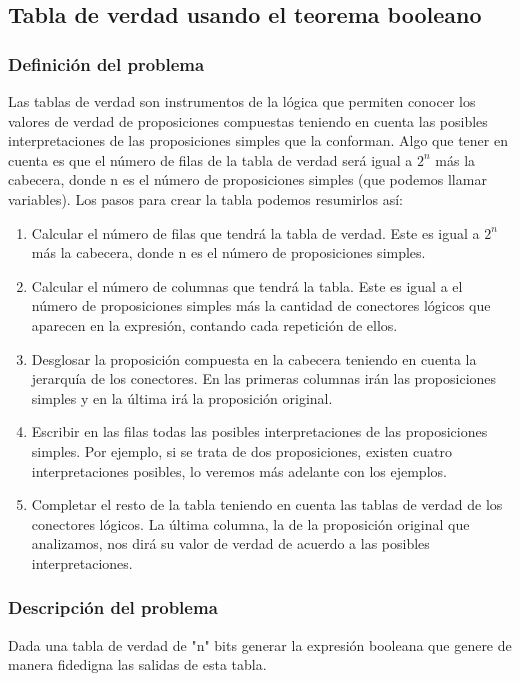 \subsection{Tabla de verdad usando el teorema booleano}

\subsubsection{Definición del problema}
Las tablas de verdad son instrumentos de la lógica que permiten conocer los valores de verdad de proposiciones compuestas teniendo en cuenta las posibles interpretaciones de las proposiciones simples que la conforman.
Algo que tener en cuenta es que el número de filas de la tabla de verdad será igual a $2^n$ más la cabecera, donde n es el número de proposiciones simples (que podemos llamar variables). Los pasos para crear la tabla podemos resumirlos así:
\begin{enumerate}
    \item Calcular el número de filas que tendrá la tabla de verdad. Este es igual a $2^n$ más la cabecera, donde n es el número de proposiciones simples.
    \item Calcular el número de columnas que tendrá la tabla. Este es igual a el número de proposiciones simples más la cantidad de conectores lógicos que aparecen en la expresión, contando cada repetición de ellos.
    \item Desglosar la proposición compuesta en la cabecera teniendo en cuenta la jerarquía de los conectores. En las primeras columnas irán las proposiciones simples y en la última irá la proposición original.
    \item Escribir en las filas todas las posibles interpretaciones de las proposiciones simples. Por ejemplo, si se trata de dos proposiciones, existen cuatro interpretaciones posibles, lo veremos más adelante con los ejemplos.
    \item Completar el resto de la tabla teniendo en cuenta las tablas de verdad de los conectores lógicos. La última columna, la de la proposición original que analizamos, nos dirá su valor de verdad de acuerdo a las posibles interpretaciones. \cite{TablasdeVerdad}
\end{enumerate}
\subsubsection{Descripción del problema}
Dada una tabla de verdad de "n" bits generar la expresión booleana que genere de manera fidedigna las salidas de esta tabla.

